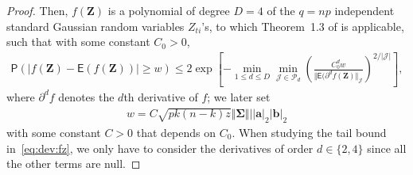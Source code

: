 \documentclass[11pt, a4paper]{article}
\newcommand{\mbf}{\mathbf}
\newcommand{\mc}{\mathcal}
\renewcommand{\l}{\left}
\renewcommand{\r}{\right}
\newcommand{\E}[0]{\mathsf{E}}
\newcommand{\p}{\mathsf{P}}
\theoremstyle{definition}
\theoremstyle{definition}
\theoremstyle{definition}
\theoremstyle{definition}
\theoremstyle{definition}
\theoremstyle{remark}
\theoremstyle{definition}
\theoremstyle{definition}
\theoremstyle{definition}
\begin{document}
\begin{proof}
Then, $f(\mbf Z)$ is a polynomial of degree $D = 4$ of the $q = np$ independent standard Gaussian random variables $Z_{ti}$'s, to which Theorem~1.3 of \cite{adamczak2015concentration} is applicable, such that with some constant $C_0 > 0$,
\begin{align}
\label{eq:dev:fz}
\p\l( \vert f(\mbf Z) - \E(f(\mbf Z)) \vert \ge w \r) \le 2 \exp\l[ - \min_{1 \le d \le D} \min_{\mc J \in \mc P_d} \l( \frac{C_0^d w}{\Vert \E(\partial^d f(\mbf Z) \Vert_{\mc J}} \r)^{2/\vert \mc J \vert} \r],
\end{align}
where $\partial^d f$ denotes the $d$th derivative of $f$; we later set
\begin{align}
\label{eq:wz}
w = C \sqrt{pk(n - k) z} \Vert \bm\Sigma \Vert \vert \vert \mbf a \vert_2 \vert \mbf b \vert_2
\end{align}
with some constant $C > 0$ that depends on $C_0$. 
When studying the tail bound in~\eqref{eq:dev:fz}, we only have to consider the derivatives of order $d \in \{2, 4\}$ since all the other terms are null.


\end{proof}
\end{document}
